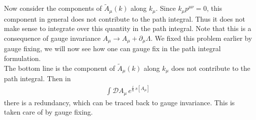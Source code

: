 \documentclass[11pt, onesided]{book}
\theoremstyle{break}
\theoremstyle{break}
\newcommand{\pd}{\partial}
\newcommand{\that}[1]{\widetilde{#1}}
\begin{document}
Now consider the components of $\that{A}_\mu(k)$ along $k_\mu$. Since $k_\mu p^{\mu\nu} = 0$,  this component in general does not contribute to the path integral. Thus it does not make sense to integrate over this quantity in the path integral. Note that this is a consequence of gauge invariance $A_\mu \to A_\mu + \pd_\mu \Lambda$. We fixed this problem earlier by gauge fixing, we will now see how one can gauge fix in the path integral formulation. \\

The bottom line is the component of $\that{A}_\mu(k)$ along $k_\mu$ does not contribute to the path integral. Then in 
\begin{align*}
\int \mathcal{D}A_\mu\, e^{\frac{i}{\hbar}\, s[A_\mu]}
\end{align*}
there is a redundancy, which can be traced back to gauge invariance. This is taken care of by gauge fixing.  \\
\end{document}
